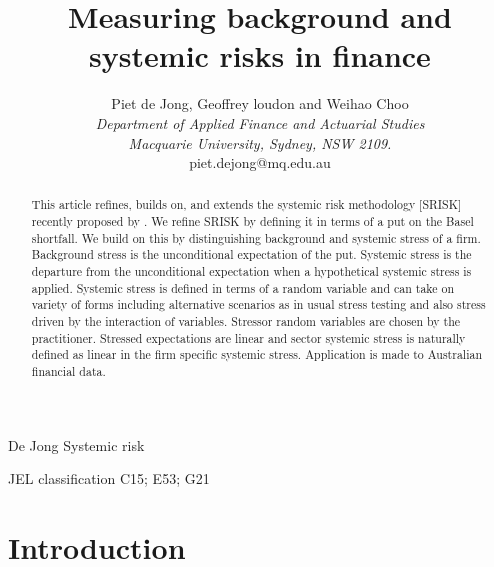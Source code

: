 \documentclass[authoryear]{elsarticle}
\begin{document}
\title{Measuring background and systemic risks in finance}
\author{Piet de Jong,  Geoffrey loudon and Weihao Choo \\[4pt]
\textit{Department of Applied Finance and Actuarial Studies\\ Macquarie University, Sydney, NSW 2109.}
\\[2pt]
{piet.dejong@mq.edu.au}}

\markboth%
{De Jong}
{Systemic risk}

\begin{abstract}
This article refines, builds on, and extends the systemic risk methodology [SRISK] recently proposed by \cite{brownlees2015}. We refine SRISK by defining it in terms of a put on the Basel shortfall. We build on this by distinguishing background and systemic stress of a firm. Background stress is the unconditional expectation of the put. Systemic stress is the departure from the unconditional expectation when a hypothetical systemic stress is applied.  Systemic stress is defined in terms of a random variable and can take on variety of forms including alternative scenarios as in usual stress testing and also 
stress driven by the interaction of variables. Stressor random variables are chosen by the practitioner. Stressed expectations are linear and sector systemic stress is naturally defined as linear in the firm specific systemic stress. Application is made to Australian financial data.
\end{abstract}

\maketitle

JEL classification
C15; E53; G21  %

\section{Introduction}
\end{document}
